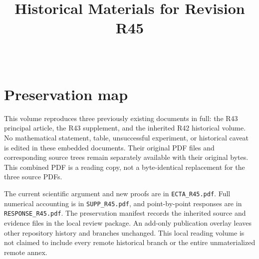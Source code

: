 
\begin{frontmatter}
\title{Historical Materials for Revision R45}
\begin{aug}\author[id=au1,addressref={add1}]{~}\address[id=add1]{}\end{aug}\end{frontmatter}
\section{Preservation map}
This volume reproduces three previously existing documents in full: the R43 principal article, the R43 supplement, and the inherited R42 historical volume. No mathematical statement, table, unsuccessful experiment, or historical caveat is edited in these embedded documents. Their original PDF files and corresponding source trees remain separately available with their original bytes. This combined PDF is a reading copy, not a byte-identical replacement for the three source PDFs.

The current scientific argument and new proofs are in \texttt{ECTA\_R45.pdf}. Full numerical accounting is in \texttt{SUPP\_R45.pdf}, and point-by-point responses are in \texttt{RESPONSE\_R45.pdf}. The preservation manifest records the inherited source and evidence files in the local review package. An add-only publication overlay leaves other repository history and branches unchanged. This local reading volume is not claimed to include every remote historical branch or the entire unmaterialized remote annex.
\clearpage




